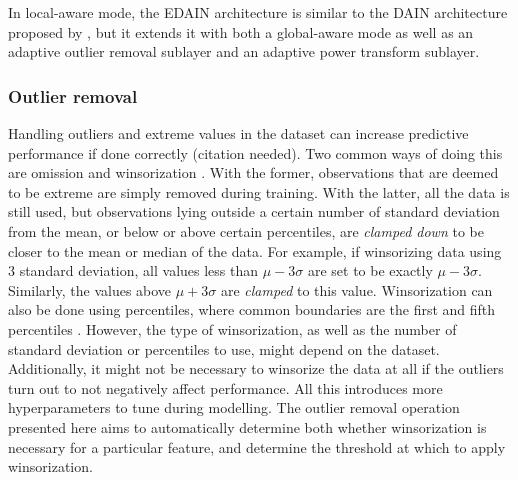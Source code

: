 \documentclass{statsmsc}
\begin{document}
In local-aware mode, the \ac{EDAIN} architecture is similar to the
\ac{DAIN} architecture proposed by \citeauthor{dain}, but it
extends it with both a global-aware mode as well as an adaptive outlier removal sublayer and 
an adaptive power transform sublayer.

\subsubsection{Outlier removal}%
\label{ssub:Outlier removal}

Handling outliers and extreme values in the dataset can increase predictive performance if done
correctly (citation needed). Two common ways of doing this are omission and winsorization
\citep{winsorization}. With the former, observations that are deemed to be extreme are simply
removed during training. With the latter, all the data is still used, but observations lying
outside a certain number of standard deviation from the mean, or below or above certain
percentiles, are \textit{clamped down} to be closer to the mean or median of the data.
For example, if winsorizing data using 3 standard deviation, all values less than
$\mu-3\sigma$ are set to be exactly $\mu-3\sigma$. Similarly, the values above
$\mu+3\sigma$ are \textit{clamped} to this value. Winsorization can also be done using percentiles,
where common boundaries are the first and fifth percentiles \citep{winsorization}.
However, the type of winsorization, as well as the number of standard deviation
or percentiles to use, might depend on the dataset. Additionally, it might not
be necessary to winsorize the data at all if the outliers turn out to not
negatively affect performance. All this introduces more hyperparameters to tune
during modelling. The outlier removal operation presented here aims to automatically  determine both
whether winsorization is necessary for a particular feature, and determine the threshold at
which to apply winsorization.
\end{document}
